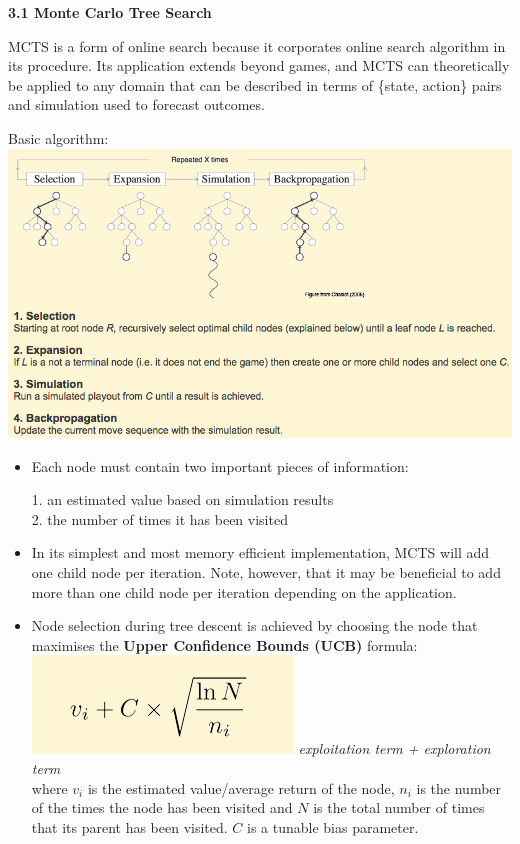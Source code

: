 \documentclass[12pt]{article}
\begin{document}
\noindent
\textbf{3.1 Monte Carlo Tree Search}

MCTS is a form of online search because it corporates online search algorithm in its procedure. Its application extends beyond games, and MCTS can theoretically be applied to any domain that can be described in terms of \{state, action\} pairs and simulation used to forecast outcomes.

\begin{tcolorbox}
Basic algorithm: \\
\includegraphics[scale=0.45]{MCTSalgo}

\begin{itemize}
\item Each node must contain two important pieces of information:

1. an estimated value based on simulation results\\
2. the number of times it has been visited


\item In its simplest and most memory efficient implementation, MCTS will add one child node per iteration. Note, however, that it may be beneficial to add more than one child node per iteration depending on the application.
\item Node selection during tree descent is achieved by choosing the node that maximises the \textbf{Upper Confidence Bounds (UCB)} formula:\\

\includegraphics[scale=0.4]{UCB}      \textsl{exploitation term + exploration term}\\

where $v_i$ is the estimated value/average return of the node, $n_i$ is the number of the times the node has been visited and $N$ is the total number of times that its parent has been visited. $C$ is a tunable bias parameter.

\end{itemize}
\end{tcolorbox}
\end{document}

